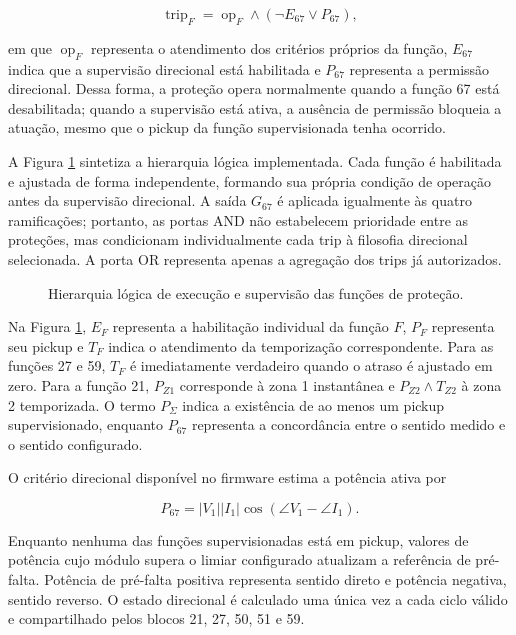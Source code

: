 \begin{equation}
  \operatorname{trip}_F=\operatorname{op}_F\land
  \left(\neg E_{67}\lor P_{67}\right),
  \label{eq:permissivo-67}
\end{equation}

em que $\operatorname{op}_F$ representa o atendimento dos critérios próprios da função, $E_{67}$ indica que a supervisão direcional está habilitada e $P_{67}$ representa a permissão direcional. Dessa forma, a proteção opera normalmente quando a função 67 está desabilitada; quando a supervisão está ativa, a ausência de permissão bloqueia a atuação, mesmo que o pickup da função supervisionada tenha ocorrido.

A Figura \ref{fig:hierarquia-protecoes} sintetiza a hierarquia lógica implementada. Cada função é habilitada e ajustada de forma independente, formando sua própria condição de operação antes da supervisão direcional. A saída $G_{67}$ é aplicada igualmente às quatro ramificações; portanto, as portas AND não estabelecem prioridade entre as proteções, mas condicionam individualmente cada trip à filosofia direcional selecionada. A porta OR representa apenas a agregação dos trips já autorizados.

\begin{figure}[H]
  \centering
  \caption{Hierarquia lógica de execução e supervisão das funções de proteção.}
  \label{fig:hierarquia-protecoes}
  
\end{figure}

Na Figura \ref{fig:hierarquia-protecoes}, $E_F$ representa a habilitação individual da função $F$, $P_F$ representa seu pickup e $T_F$ indica o atendimento da temporização correspondente. Para as funções 27 e 59, $T_F$ é imediatamente verdadeiro quando o atraso é ajustado em zero. Para a função 21, $P_{Z1}$ corresponde à zona 1 instantânea e $P_{Z2}\land T_{Z2}$ à zona 2 temporizada. O termo $P_{\Sigma}$ indica a existência de ao menos um pickup supervisionado, enquanto $P_{67}$ representa a concordância entre o sentido medido e o sentido configurado.

O critério direcional disponível no firmware estima a potência ativa por

\begin{equation}
  P_{67}=|V_1||I_1|\cos(\angle V_1-\angle I_1).
\end{equation}

Enquanto nenhuma das funções supervisionadas está em pickup, valores de potência cujo módulo supera o limiar configurado atualizam a referência de pré-falta. Potência de pré-falta positiva representa sentido direto e potência negativa, sentido reverso. O estado direcional é calculado uma única vez a cada ciclo válido e compartilhado pelos blocos 21, 27, 50, 51 e 59.

